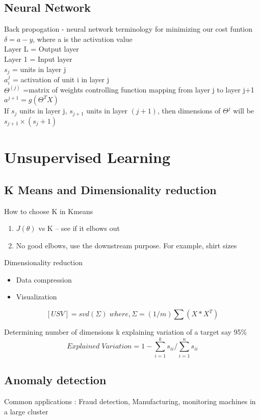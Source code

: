 \documentclass[12pt,a4paper]{article}
\begin{document}
\subsection{Neural Network}
Back propogation - neural network terminology for minimizing our cost funtion
$\delta = a -y$, where a is the activation value\\
Layer L = Output layer\\
Layer 1 = Input layer\\
$s_j$ = units in layer j\\
$a_i^{j}$ = activation of unit i in layer j\\
$\Theta^{(j)}$ =matrix of weights controlling function mapping from layer j to layer j+1\\
$a^{j+1} = g(\Theta^TX)$\\
If $s_j$ units in layer j, $s_{j+1}$ units in layer $(j+1)$, then dimensions of $\Theta^{j}$ will be $s_{j+1}\times(s_{j}+1)$

\section{Unsupervised Learning}
\subsection{K Means and Dimensionality reduction}

How to choose K in Kmeans 
\begin{enumerate}
\item $J(\theta)$ vs K -- see if it elbows out
\item No good elbows, use the downstream purpose. For example, shirt sizes
\end{enumerate}


Dimensionality reduction
\begin{itemize}
\item Data compression
\item Visualization
\end{itemize}

\[
[U S V] = svd(\Sigma)    \;where , \Sigma  = (1/m)\sum (X*X^T)
\]

Determining number of dimensions k explaining variation of a target say 95\% 
\[Explained\;Variation = 1 - \sum_{i=1}^k s_{ii}/\sum_{i=1}^n s_{ii}\]

\subsection{Anomaly detection}
Common applications : Fraud detection, Manufacturing, monitoring machines in a large cluster
\end{document}
